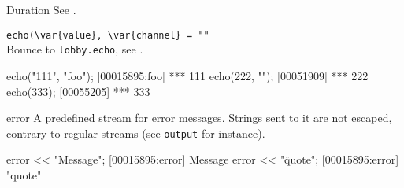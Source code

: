 \begin{urbiscriptapi}
\item[Duration] See .

\item \lstinline|echo(\var{value}, \var{channel} = ""|\\
  Bounce to \lstinline|lobby.echo|, see .
\begin{urbiscript}
echo("111", "foo");
[00015895:foo] *** 111
echo(222, "");
[00051909] *** 222
echo(333);
[00055205] *** 333
\end{urbiscript}

\item[error] A predefined stream for error messages.  Strings sent to it are not
  escaped, contrary to regular streams (see \lstinline|output| for
  instance).
\begin{urbiscript}
error << "Message";
[00015895:error] Message
error << "\"quote\"";
[00015895:error] "quote"
\end{urbiscript}



\end{urbiscriptapi}
